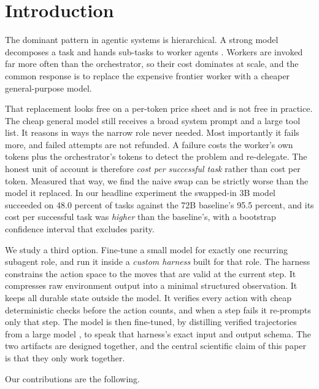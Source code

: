 \documentclass[11pt]{article}
\begin{document}
\vspace{0.5em}

\section{Introduction}

The dominant pattern in agentic systems is hierarchical. A strong model
decomposes a task and hands sub-tasks to worker agents
\citep{yao2023react}. Workers are invoked far more often than the
orchestrator, so their cost dominates at scale, and the common response is to
replace the expensive frontier worker with a cheaper general-purpose model.

That replacement looks free on a per-token price sheet and is not free in
practice. The cheap general model still receives a broad system prompt and a
large tool list. It reasons in ways the narrow role never needed. Most
importantly it fails more, and failed attempts are not refunded. A failure
costs the worker's own tokens plus the orchestrator's tokens to detect the
problem and re-delegate. The honest unit of account is therefore
\emph{cost per successful task} rather than cost per token. Measured that
way, we find the naive swap can be strictly worse than the model it replaced.
In our headline experiment the swapped-in 3B model succeeded on 48.0 percent
of tasks against the 72B baseline's 95.5 percent, and its cost per successful
task was \emph{higher} than the baseline's, with a bootstrap confidence
interval that excludes parity.

We study a third option. Fine-tune a small model for exactly one recurring
subagent role, and run it inside a \emph{custom harness} built for that role.
The harness constrains the action space to the moves that are valid at the
current step. It compresses raw environment output into a minimal structured
observation. It keeps all durable state outside the model. It verifies every
action with cheap deterministic checks before the action counts, and when a
step fails it re-prompts only that step. The model is then fine-tuned, by
distilling verified trajectories from a large model
\citep{hinton2015distill, hsieh2023step}, to speak that harness's exact
input and output schema. The two artifacts are designed together, and the
central scientific claim of this paper is that they only work together.

Our contributions are the following.
\end{document}
